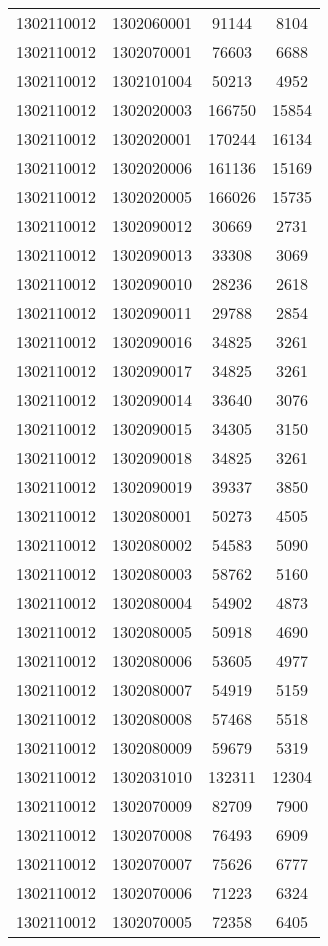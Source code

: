 \begin{longtable}{llcc}
1302110012 & 1302060001 & 91144 & 8104\\
1302110012 & 1302070001 & 76603 & 6688\\
1302110012 & 1302101004 & 50213 & 4952\\
1302110012 & 1302020003 & 166750 & 15854\\
1302110012 & 1302020001 & 170244 & 16134\\
1302110012 & 1302020006 & 161136 & 15169\\
1302110012 & 1302020005 & 166026 & 15735\\
1302110012 & 1302090012 & 30669 & 2731\\
1302110012 & 1302090013 & 33308 & 3069\\
1302110012 & 1302090010 & 28236 & 2618\\
1302110012 & 1302090011 & 29788 & 2854\\
1302110012 & 1302090016 & 34825 & 3261\\
1302110012 & 1302090017 & 34825 & 3261\\
1302110012 & 1302090014 & 33640 & 3076\\
1302110012 & 1302090015 & 34305 & 3150\\
1302110012 & 1302090018 & 34825 & 3261\\
1302110012 & 1302090019 & 39337 & 3850\\
1302110012 & 1302080001 & 50273 & 4505\\
1302110012 & 1302080002 & 54583 & 5090\\
1302110012 & 1302080003 & 58762 & 5160\\
1302110012 & 1302080004 & 54902 & 4873\\
1302110012 & 1302080005 & 50918 & 4690\\
1302110012 & 1302080006 & 53605 & 4977\\
1302110012 & 1302080007 & 54919 & 5159\\
1302110012 & 1302080008 & 57468 & 5518\\
1302110012 & 1302080009 & 59679 & 5319\\
1302110012 & 1302031010 & 132311 & 12304\\
1302110012 & 1302070009 & 82709 & 7900\\
1302110012 & 1302070008 & 76493 & 6909\\
1302110012 & 1302070007 & 75626 & 6777\\
1302110012 & 1302070006 & 71223 & 6324\\
1302110012 & 1302070005 & 72358 & 6405\\

\end{longtable}
